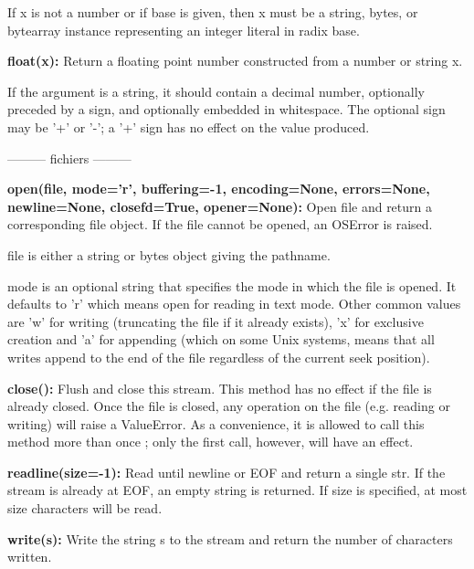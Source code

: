 If x is not a number or if base is given, then x must be a string, bytes, or bytearray instance representing an integer literal in radix base.

\vspace{.5cm}

\textsf{\textbf{float(x):}} Return a floating point number constructed from a number or string x.

If the argument is a string, it should contain a decimal number, optionally preceded by a sign, and optionally embedded in whitespace. The optional sign may be '+' or '-'; a '+' sign has no effect on the value produced.

\begin{center}
--------- fichiers ---------
\end{center}

\textsf{\textbf{open(file, mode='r', buffering=-1, encoding=None, errors=None, newline=None,
closefd=True, opener=None):}} Open file and return a corresponding file object. If the file
cannot be opened, an OSError is raised.

file is either a string or bytes object giving the pathname.

mode is an optional string that specifies the mode in which the file is opened. It defaults
to 'r' which means open for reading in text mode. Other common values are 'w' for writing
(truncating the file if it already exists), 'x' for exclusive creation and 'a' for appending (which
on some Unix systems, means that all writes append to the end of the file regardless of the
current seek position).

\vspace{.5cm}

\textsf{\textbf{close():}} Flush and close this stream. This method has no effect if the file is already closed.
Once the file is closed, any operation on the file (e.g. reading or writing) will raise a ValueError.
As a convenience, it is allowed to call this method more than once ; only the first call, however,
will have an effect.

\vspace{.5cm}

\textsf{\textbf{readline(size=-1):}} Read until newline or EOF and return a single str. If the stream is already at EOF, an empty string is returned.
If size is specified, at most size characters will be read.

\vspace{.5cm}

\textsf{\textbf{write(s):}} Write the string s to the stream and return the number of characters written.

